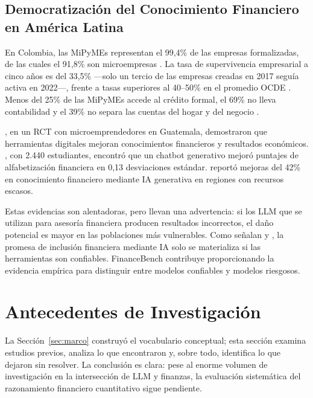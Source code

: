 \documentclass[12pt,a4paper]{article}
\begin{document}
\subsection{Democratización del Conocimiento Financiero en América Latina}

En Colombia, las MiPyMEs representan el 99,4\% de las empresas formalizadas, de las cuales el 91,8\% son microempresas \citep{Asobancaria2022}. La tasa de supervivencia empresarial a cinco años es del 33,5\% ---solo un tercio de las empresas creadas en 2017 seguía activa en 2022---, frente a tasas superiores al 40--50\% en el promedio OCDE \citep{Confecamaras2023}. Menos del 25\% de las MiPyMEs accede al crédito formal, el 69\% no lleva contabilidad y el 39\% no separa las cuentas del hogar y del negocio \citep{Asobancaria2022}.

\citet{Estefan2023}, en un RCT con microemprendedores en Guatemala, demostraron que herramientas digitales mejoran conocimientos financieros y resultados económicos. \citet{Polanco2024}, con 2.440 estudiantes, encontró que un chatbot generativo mejoró puntajes de alfabetización financiera en 0,13 desviaciones estándar. \citet{Yang2025} reportó mejoras del 42\% en conocimiento financiero mediante IA generativa en regiones con recursos escasos.

Estas evidencias son alentadoras, pero llevan una advertencia: si los LLM que se utilizan para asesoría financiera producen resultados incorrectos, el daño potencial es mayor en las poblaciones más vulnerables. Como señalan \citet{CGAP2025} y \citet{FSB2024}, la promesa de inclusión financiera mediante IA solo se materializa si las herramientas son confiables. FinanceBench contribuye proporcionando la evidencia empírica para distinguir entre modelos confiables y modelos riesgosos.

\section{Antecedentes de Investigación}\label{sec:antecedentes}

La Sección~\ref{sec:marco} construyó el vocabulario conceptual; esta sección examina estudios previos, analiza lo que encontraron y, sobre todo, identifica lo que dejaron sin resolver. La conclusión es clara: pese al enorme volumen de investigación en la intersección de LLM y finanzas, la evaluación sistemática del razonamiento financiero cuantitativo sigue pendiente.
\end{document}
